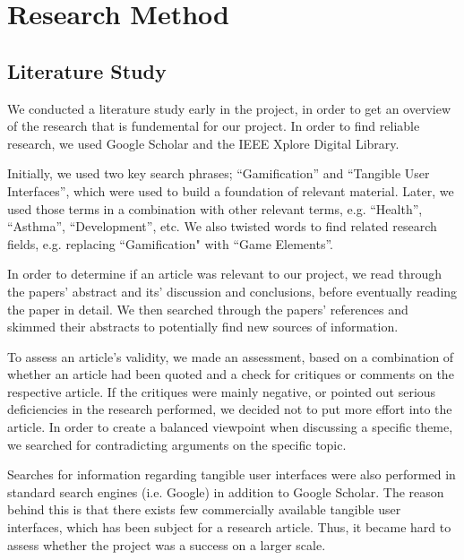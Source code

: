 \chapter{Research Method}
\label{chp:researchmethod}

\section{Literature Study}
\label{sec:literaturestudy}

We conducted a literature study early in the project, in order to get an overview of the research that is fundemental for our project. In order to find reliable research, we used Google Scholar and the IEEE Xplore Digital Library. 

Initially, we used two key search phrases; ``Gamification'' and ``Tangible User Interfaces'', which were used to build a foundation of relevant material. Later, we used those terms in a combination with other relevant terms, e.g. ``Health'', ``Asthma'', ``Development'', etc. We also twisted words to find related research fields, e.g. replacing ``Gamification" with ``Game Elements''. 

In order to determine if an article was relevant to our project, we read through the papers' abstract and its' discussion and conclusions, before eventually reading the paper in detail. We then searched through the papers' references and skimmed their abstracts to potentially find new sources of information. 

To assess an article's validity, we made an assessment, based on a combination of whether an article had been quoted and a check for critiques or comments on the respective article. If the critiques were mainly negative, or pointed out serious deficiencies in the research performed, we decided not to put more effort into the article. In order to create a balanced viewpoint when discussing a specific theme, we searched for contradicting arguments on the specific topic.  

Searches for information regarding tangible user interfaces were also performed in standard search engines (i.e. Google) in addition to Google Scholar. The reason behind this is that there exists few commercially available tangible user interfaces, which has been subject for a research article. Thus, it became hard to assess whether the project was a success on a larger scale. 
 
